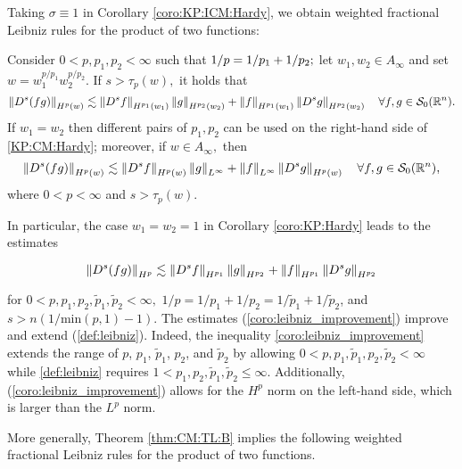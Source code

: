 Taking $\sigma \equiv 1$ in Corollary \ref{coro:KP:ICM:Hardy}, we obtain weighted fractional Leibniz rules for the product of two functions: 

\begin{corollary}\label{coro:KP:Hardy} 
Consider  $0 < p, p_1, p_2  < \infty$  such that $1/p=1/p_1+1/p_2;$ let  $w_1,w_2\in A_\infty$ and set $w=w_1^{{p}/{p_1}} w_2^{{p}/{p_2}}.$ 
If  $s > \tau_{p}(w),$ it holds that
\begin{equation}\label{KP:CM:Hardy}
\left\|D^s(fg)\right\|_{H^p(w)} \lesssim \left\|D^s f\right\|_{H^{p_1}(w_1)} \left\|g\right\|_{H^{p_2}(w_2)} +  \left\|f\right\|_{H^{p_1}(w_1)}   \left\|D^s g\right\|_{H^{p_2}(w_2)} \quad \forall f, g \in {\mathcal{S}_0}({{\mathbb R}^n}).
\end{equation}
If $w_1=w_2$ then different pairs of $p_1, p_2$ can be used on the right-hand side of \eqref{KP:CM:Hardy}; moreover, if $w\in A_\infty,$ then 
\begin{equation*}
\left\|D^s(fg)\right\|_{H^p(w)} \lesssim \left\|D^s f\right\|_{H^{p}(w)} \left\|g\right\|_{L^\infty} +  \left\|f\right\|_{L^\infty}   \left\|D^s g\right\|_{H^{p}(w)} \quad \forall f, g \in {\mathcal{S}_0}({{\mathbb R}^n}),
\end{equation*}
where $0<p<\infty$ and $s>\tau_{p}(w).$
\end{corollary}

In particular, the case $w_1 = w_2 = 1$ in Corollary \ref{coro:KP:Hardy} leads to the estimates

\begin{equation}\label{coro:leibniz_improvement}
\left\|D^s(fg)\right\|_{H^p} \lesssim \left\|D^s f\right\|_{H^{p_1}} \left\|g\right\|_{H^{p_2}} +  \left\|f\right\|_{H^{p_1}}   \left\|D^s g\right\|_{H^{p_2}}
\end{equation}

\noindent for $0<p,p_1,p_2, \tilde{p}_1, \tilde{p}_2 < \infty,$ $1/p = 1/p_1 + 1/p_2 = 1/\tilde{p}_1 + 1/\tilde{p}_2$, and $s>n(1/\text{min}(p,1) - 1)$. The estimates (\ref{coro:leibniz_improvement}) improve and extend (\ref{def:leibniz}). Indeed, the inequality \eqref{coro:leibniz_improvement} extends the range of $p$, $p_1$, $\tilde{p}_1$, $p_2$, and $\tilde{p}_2$ by allowing $0<p,p_1,\tilde{p}_1,p_2,\tilde{p}_2<\infty$ while \eqref{def:leibniz} requires $1<p_1,p_2,\tilde{p}_1, \tilde{p}_2\leq \infty$. Additionally, (\ref{coro:leibniz_improvement}) allows for the $H^p$ norm on the left-hand side, which is larger than the $L^p$ norm. 

More generally, Theorem \ref{thm:CM:TL:B} implies the following weighted fractional Leibniz rules for the product of two functions. 

